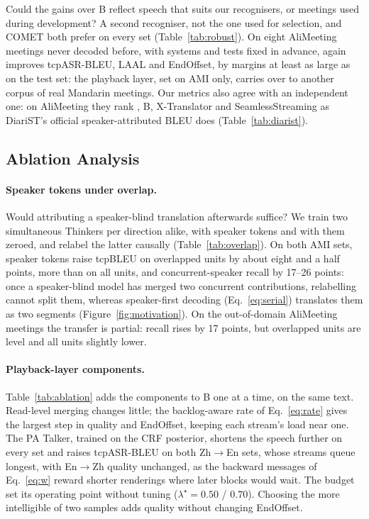 Could the gains over B reflect speech that suits our recognisers, or meetings used during development? A second
recogniser, not the one used for selection, and COMET both prefer \sys{} on every set
(Table~\ref{tab:robust}). On eight AliMeeting meetings never decoded before, with systems and tests fixed in advance,
\sys{} again improves tcpASR-BLEU, LAAL and EndOffset, by margins at least as large as on the test set: the
playback layer, set on AMI only, carries over to another corpus of real Mandarin meetings. Our metrics
also agree with an independent one: on AliMeeting they rank \sys{}, B, X-Translator and SeamlessStreaming as DiariST's
official speaker-attributed BLEU does (Table~\ref{tab:diarist}).




\subsection{Ablation Analysis}
\label{sec:res-ablation}
\label{sec:res-overlap}

\paragraph{Speaker tokens under overlap.} Would attributing a speaker-blind translation afterwards suffice? We train two simultaneous Thinkers per direction alike, with speaker tokens and with them zeroed,
and relabel the latter causally (Table~\ref{tab:overlap}). On both AMI sets, speaker tokens raise tcpBLEU on overlapped
units by about eight and a half points, more than on all units, and concurrent-speaker recall by 17--26 points: once a
speaker-blind model has merged two concurrent contributions, relabelling cannot split them, whereas speaker-first
decoding (Eq.~\eqref{eq:serial}) translates them as two segments (Figure~\ref{fig:motivation}). On the out-of-domain
AliMeeting meetings the transfer is partial: recall rises by 17 points, but overlapped units are level and all units
slightly lower.

\paragraph{Playback-layer components.} Table~\ref{tab:ablation} adds the components to B one at a time, on the same
text. Read-level merging changes little; the backlog-aware rate of Eq.~\eqref{eq:rate} gives the largest step in quality
and EndOffset, keeping each stream's load near one. The PA Talker, trained on the CRF posterior, shortens the speech
further on every set and raises tcpASR-BLEU on both Zh$\rightarrow$En sets, whose streams queue longest, with
En$\rightarrow$Zh quality unchanged, as the backward messages of Eq.~\eqref{eq:w} reward shorter renderings where later
blocks would wait. The budget set its operating point without tuning ($\lambda^\star=0.50$ / $0.70$). Choosing the more intelligible of two samples adds quality without changing EndOffset.

